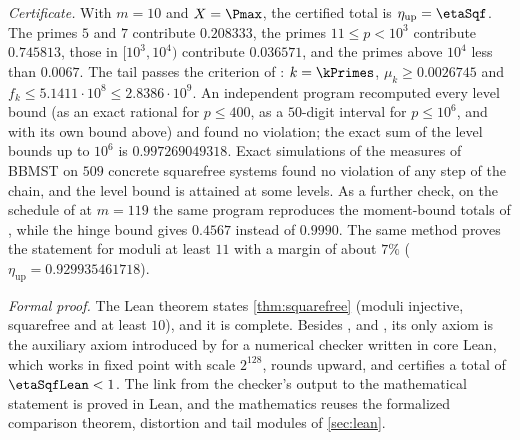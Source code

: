 \emph{Certificate.} With $m=10$ and $X=\Pmax$, the certified total is $\eta_{\mathrm{up}}=\etaSqf$. The primes $5$
and $7$ contribute $0.208333$, the primes $11\le p<10^3$ contribute $0.745813$, those in $[10^3,10^4)$ contribute
$0.036571$, and the primes above $10^4$ less than $0.0067$. The tail passes the criterion of \cite[Theorem~6.1]{BBMST}:
$k=\kPrimes$, $\mu_k\ge0.0026745$ and $f_k\le5.1411\cdot10^8\le2.8386\cdot10^9$.
An independent program recomputed every level bound (as an exact rational for $p\le400$, as a $50$-digit interval for $p\le10^6$, and with its own
bound above) and found no violation; the exact sum of the level bounds up to $10^6$ is $0.997269049318$. Exact
simulations of the measures of BBMST on $509$ concrete squarefree systems found no violation of any step of the
chain, and the level bound is attained at some levels. As a further check, on the schedule of \cite{CFT2025} at
$m=119$ the same program reproduces the moment-bound totals of \cite{CFT2025}, while the hinge bound gives
$0.4567$ instead of $0.9990$. The same method proves the statement for moduli at least $11$ with a margin of about
$7\%$ ($\eta_{\mathrm{up}}=0.929935461718$).

\emph{Formal proof.} The Lean theorem  states \cref{thm:squarefree}
(moduli  injective, squarefree and at least $10$), and it is complete. Besides ,
 and , its only axiom is the auxiliary axiom introduced by
 for a numerical checker written in core Lean, which works in fixed point with scale $2^{128}$,
rounds upward, and certifies a total of $\etaSqfLean<1$. The link from the checker's output to the mathematical
statement is proved in Lean, and the mathematics reuses the formalized comparison theorem, distortion and tail
modules of \cref{sec:lean}.

